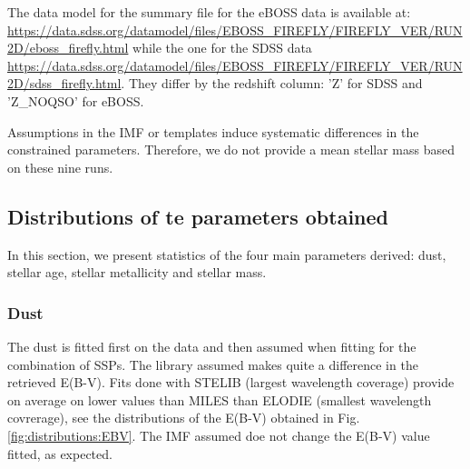 \documentclass[onecolumn]{aa}
\begin{document}
The data model for the summary file for the eBOSS data is available at: 
\url{https://data.sdss.org/datamodel/files/EBOSS_FIREFLY/FIREFLY_VER/RUN2D/eboss_firefly.html} while the one for the SDSS data \url{https://data.sdss.org/datamodel/files/EBOSS_FIREFLY/FIREFLY_VER/RUN2D/sdss_firefly.html}.
They differ by the redshift column: 'Z' for SDSS and 'Z\_NOQSO' for eBOSS.  

Assumptions in the IMF or templates induce systematic differences in the constrained parameters. 
Therefore, we do not provide a mean stellar mass based on these nine runs.


\subsection{Distributions of te parameters obtained}
In this section, we present statistics of the four main parameters derived: dust, stellar age, stellar metallicity and stellar mass.

\subsubsection{Dust}
The dust is fitted first on the data and then assumed when fitting for the combination of SSPs. 
The library assumed makes quite a difference in the retrieved E(B-V). 
Fits done with STELIB (largest wavelength coverage) provide on average on lower values than MILES than ELODIE (smallest wavelength covrerage), see the distributions of the E(B-V) obtained in Fig. \ref{fig:distributions:EBV}. 
The IMF assumed doe not change the E(B-V) value fitted, as expected.
\end{document}
